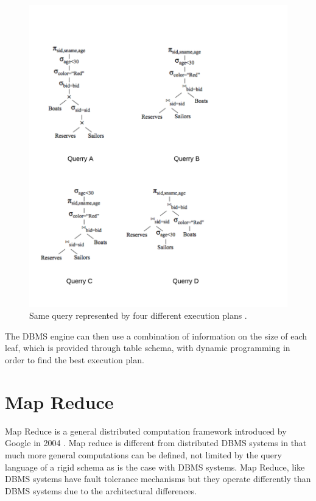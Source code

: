 \documentclass[10pt,twocolumn]{IEEEtran11}
\begin{document}
\begin{figure}[h]
	\centering
	\includegraphics[scale=0.90]{images/logicalExecution.png}
	\caption{Same query represented by four different execution plans \protect\cite{LectureDB}. }
	\label{fig:queryExecutionPlan}
\end{figure}

The DBMS engine can then use a combination of information on the size of each leaf, which is provided through table schema, with dynamic programming in order to find the best execution plan.

\section {Map Reduce}

Map Reduce is a general distributed computation framework introduced by Google in 2004 \cite{dean2001mapreduce}.  Map reduce is different from distributed DBMS systems in that much more general computations can be defined, not limited by the query language of a rigid schema as is the case with DBMS systems.  Map Reduce, like DBMS systems have fault tolerance mechanisms but they operate differently than DBMS systems due to the architectural differences. 
\end{document}
